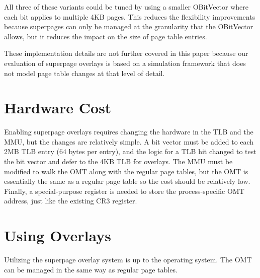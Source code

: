 All three of these variants could be tuned by using a smaller OBitVector where each bit applies to multiple 4KB pages. This reduces the flexibility improvements because superpages can only be managed at the granularity that the OBitVector allows, but it reduces the impact on the size of page table entries.

These implementation details are not further covered in this paper because our evaluation of superpage overlays is based on a simulation framework that does not model page table changes at that level of detail.

\section{Hardware Cost}
Enabling superpage overlays requires changing the hardware in the TLB and the MMU, but the changes are relatively simple. A bit vector must be added to each 2MB TLB entry (64 bytes per entry), and the logic for a TLB hit changed to test the bit vector and defer to the 4KB TLB for overlays. The MMU must be modified to walk the OMT along with the regular page tables, but the OMT is essentially the same as a regular page table so the cost should be relatively low. Finally, a special-purpose register is needed to store the process-specific OMT address, just like the existing CR3 register.

\section{Using Overlays}
Utilizing the superpage overlay system is up to the operating system. The OMT can be managed in the same way as regular page tables.


